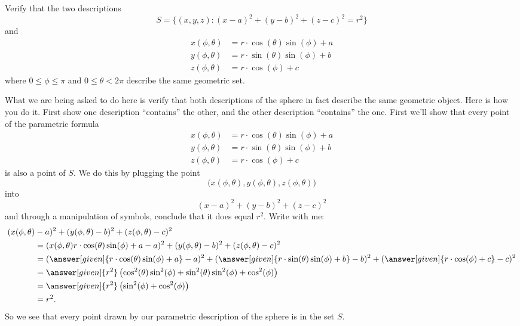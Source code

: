 \documentclass{ximera}
\begin{document}
\begin{example}
  Verify that the two descriptions
  \[
  S = \{(x,y,z):(x-a)^2+(y-b)^2+(z-c)^2=r^2\}
  \]
  and
  \begin{align*}
    x(\phi,\theta) &=r\cdot\cos(\theta)\sin(\phi)+a\\
    y(\phi,\theta) &=r\cdot\sin(\theta)\sin(\phi)+b\\
    z(\phi,\theta) &=r\cdot\cos(\phi)+c
  \end{align*}
  where $0\le \phi\le \pi$ and $0\le \theta<2\pi$ describe the same geometric set.
  \begin{explanation}
    What we are being asked to do here is verify that both
    descriptions of the sphere in fact describe the same geometric
    object.  Here is how you do it. First show one description
    ``contains'' the other, and the other description ``contains'' the
    one. First we'll show that every point of the parametric formula
    \begin{align*}
    x(\phi,\theta) &=r\cdot\cos(\theta)\sin(\phi)+a\\
    y(\phi,\theta) &=r\cdot\sin(\theta)\sin(\phi)+b\\
    z(\phi,\theta) &=r\cdot\cos(\phi)+c
    \end{align*}
    is also a point of $S$. We do this by plugging the point
    \[
    \big(x(\phi,\theta),y(\phi,\theta),z(\phi,\theta)\big)
    \]
    into 
    \[
    (x-a)^2+(y-b)^2+(z-c)^2
    \]
    and through a manipulation of symbols, conclude that it does equal
    $r^2$. Write with me:
    \begin{align*}
      (x(\phi,\theta)&-a)^2+(y(\phi,\theta)-b)^2+(z(\phi,\theta)-c)^2 \\
      &= (x(\phi,\theta)r\cdot\cos(\theta)\sin(\phi)+a-a)^2+(y(\phi,\theta)-b)^2+(z(\phi,\theta)-c)^2\\
      &= (\answer[given]{r\cdot\cos(\theta)\sin(\phi)+a}-a)^2+(\answer[given]{r\cdot\sin(\theta)\sin(\phi)+b}-b)^2+(\answer[given]{r\cdot\cos(\phi)+c}-c)^2\\
      &= \answer[given]{r^2}\left(\cos^2(\theta)\sin^2(\phi) + \sin^2(\theta)\sin^2(\phi) + \cos^2(\phi)\right)\\
      &= \answer[given]{r^2}\left(\sin^2(\phi) + \cos^2(\phi)\right)\\
      &= r^2.
    \end{align*}
    So we see that every point drawn by our parametric description of
    the sphere is in the set $S$. 
  \end{explanation}
\end{example}
\end{document}
